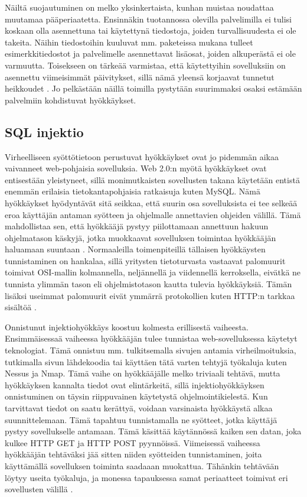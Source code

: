 Näiltä suojautuminen on melko yksinkertaista, kunhan muistaa noudattaa muutamaa pääperiaatetta. Ensinnäkin tuotannossa 
olevilla palvelimilla ei tulisi koskaan olla asennettuna tai käytettynä tiedostoja, joiden turvallisuudesta ei ole
takeita. Näihin tiedostoihin kuuluvat mm. paketeissa mukana tulleet esimerkkitiedostot ja palvelimelle asennettavat 
lisäosat, joiden alkuperästä ei ole varmuutta. Toisekseen on tärkeää varmistaa, että käytettyihin sovelluksiin
on asennettu viimeisimmät päivitykset, sillä nämä yleensä korjaavat tunnetut heikkoudet \cite{Hacking}. Jo pelkästään näillä 
toimilla pystytään suurimmaksi osaksi estämään palvelmiin kohdistuvat hyökkäykset. 

\subsection{SQL injektio}

Virheelliseen syöttötietoon perustuvat hyökkäykset ovat jo pidemmän aikaa vaivanneet web-pohjaisia sovelluksia.
Web 2.0:n myötä hyökkäykset ovat entisestään yleistyneet, sillä monimutkaisten sovellusten takana käytetään entistä
enemmän erilaisia tietokantapohjaisia ratkaisuja kuten MySQL. Nämä hyökkäykset hyödyntävät sitä seikkaa, että suurin osa
sovelluksista ei tee selkeää eroa käyttäjän antaman syötteen ja ohjelmalle annettavien ohjeiden välillä. Tämä mahdollistaa
sen, että hyökkääjä pystyy piilottamaan annettuun hakuun ohjelmatason käskyjä, jotka muokkaavat sovelluksen toimintaa
hyökkääjän haluamaan suuntaan \cite{WEB2}. Normaaleilla toimenpiteillä tällaisen hyökkäysten tunnistaminen on hankalaa, sillä
yritysten tietoturvasta vastaavat palomuurit toimivat OSI-mallin kolmannella, neljännellä ja viidennellä kerroksella, eivätkä ne tunnista
ylimmän tason eli ohjelmistotason kautta tulevia hyökkäyksiä. Tämän lisäksi useimmat palomuurit eivät ymmärrä protokollien
kuten HTTP:n tarkkaa sisältöä \cite{SQL SS}.    

Onnistunut injektiohyökkäys koostuu kolmesta erillisestä vaiheesta. Ensimmäisessaä vaiheessa hyökkääjän tulee tunnistaa 
web-sovelluksessa käytetyt teknologiat. Tämä onnistuu mm. tulkitsemalla sivujen antamia virheilmoituksia, tutkimalla 
sivun lähdekoodia tai käyttäen tätä varten tehtyjä työkaluja kuten Nessus ja Nmap. Tämä vaihe on hyökkääjälle melko triviaali
tehtävä, mutta hyökkäyksen kannalta tiedot ovat elintärkeitä, sillä injektiohyökkäyksen onnistuminen on täysin riippuvainen 
käytetystä ohjelmointikielestä. Kun tarvittavat tiedot on saatu kerättyä, voidaan varsinaista hyökkäystä alkaa suunnittelemaan.
Tämä tapahtuu tunnistamalla ne syötteet, jotka käyttäjä pystyy sovellukselle antamaan. Tämä käsittää käytännössä kaiken sen 
datan, joka kulkee HTTP GET ja HTTP POST pyynnöissä. Viimeisessä vaiheessa hyökkääjän tehtäväksi jää sitten niiden syötteiden 
tunnistaminen, joita käyttämällä sovelluksen toiminta saadaaan muokattua. Tähänkin tehtävään löytyy useita työkaluja, ja
monessa tapauksessa samat periaatteet toimivat eri sovellusten välillä \cite{WEB2}.

